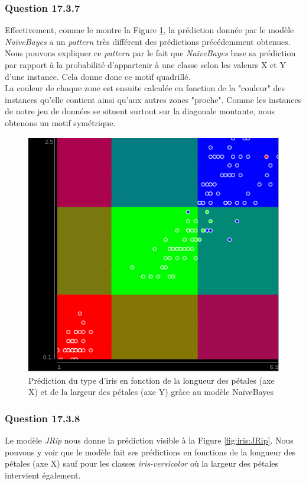 \documentclass[10pt,a4paper]{article}
\begin{document}
			\subsubsection*{Question 17.3.7}
			
			Effectivement, comme le montre la Figure \ref{fig:iris:NaiveBayes}, la prédiction donnée par le modèle \textit{NaïveBayes} a un \textit{pattern} très différent des prédictions précédemment obtenues.\\
			
			Nous pouvons expliquer ce \textit{pattern} par le fait que \textit{NaïveBayes} base sa prédiction par rapport à la probabilité d'appartenir à une classe selon les valeurs X et Y d'une instance. Cela donne donc ce motif quadrillé.\\
			
			La couleur de chaque zone est ensuite calculée en fonction de la "couleur" des instances qu'elle contient ainsi qu'aux autres zones "proche". Comme les instances de notre jeu de données se situent surtout sur la diagonale montante, nous obtenons un motif symétrique.	
			
			\begin{figure}[!]
				\centering
				\includegraphics[width=.5\textwidth]{iris_NaiveBayes}
				\caption{Prédiction du type d'iris en fonction de la longueur des pétales (axe X) et de la largeur des pétales (axe Y) grâce au modèle NaïveBayes}
				\label{fig:iris:NaiveBayes}
			\end{figure}
			
			\subsubsection*{Question 17.3.8}
			
			Le modèle \textit{JRip} nous donne la prédiction visible à la Figure \ref{fig:iris:JRip}. Nous pouvons y voir que le modèle fait ses prédictions en fonctions de la longueur des pétales (axe X) sauf pour les classes \textit{iris-versicolor} où la largeur des pétales intervient également.\\
			
\end{document}
